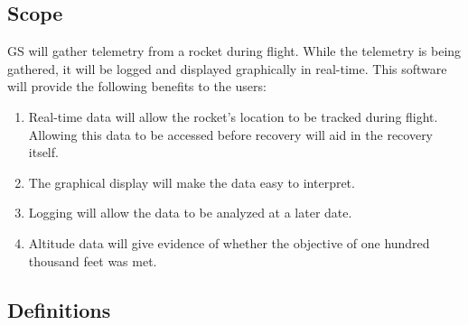 \documentclass[10pt,draftclsnofoot,onecolumn]{IEEEtran}
\begin{document}
	\subsection{Scope}
	GS will gather telemetry from a rocket during flight.
	While the telemetry is being gathered, it will be logged and displayed graphically in real-time.
	This software will provide the following benefits to the users:
	\begin{enumerate}
		\item Real-time data will allow the rocket's location to be tracked during flight.
		Allowing this data to be accessed before recovery will aid in the recovery itself.
		\item The graphical display will make the data easy to interpret.
		\item Logging will allow the data to be analyzed at a later date.
		\item Altitude data will give evidence of whether the objective of one hundred thousand feet was met.
	\end{enumerate}

	\subsection{Definitions}
\end{document}
